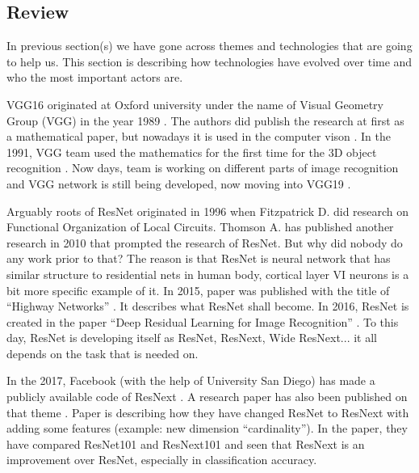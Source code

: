 \subsection{Review}
In previous section(s) we have gone across themes and technologies that are going to help us. This section is describing how technologies have evolved over time and who the most important actors are.
\newline

VGG16 originated at Oxford university under the name of Visual Geometry Group (VGG) in the year 1989 \parencite{zisserman1989information}. The authors did publish the research at first as a mathematical paper, but nowadays it is used in the computer vison \parencite{simonyan2014very}. In the 1991, VGG team used the mathematics for the first time for the 3D object recognition \parencite{forsyth1991invariant}. Now days, team is working on different parts of image recognition and VGG network is still being developed, now moving into VGG19 \parencite{xiao2020application}.
\newline

Arguably roots of ResNet originated in 1996 \parencite{fitzpatrick1996functional} when Fitzpatrick D. did research on Functional Organization of Local Circuits. Thomson A. \parencite{thomson2010neocortical} has published another research in 2010 that prompted the research of ResNet. But why did nobody do any work prior to that? The reason is that ResNet is neural network that has similar structure to residential nets in human body, cortical layer VI neurons \parencite{proulx2014nicotinic} is a bit more specific example of it. In 2015, paper was published with the title of “Highway Networks” \parencite{srivastava2015highway}. It describes what ResNet shall become. In 2016, ResNet is created in the paper “Deep Residual Learning for Image Recognition” \parencite{he2016deep}. To this day, ResNet is developing itself as ResNet, ResNext, Wide ResNext... it all depends on the task that is needed on.
\newline

In the 2017, Facebook (with the help of University San Diego) has made a publicly available code of ResNext \parencite{web:resNeXtGitHub}. A research paper has also been published on that theme \parencite{xie2017aggregated}. Paper is describing how they have changed ResNet to ResNext with adding some features (example: new dimension “cardinality”). In the paper, they have compared ResNet101 and ResNext101 and seen that ResNext is an improvement over ResNet, especially in classification accuracy.
\newline

